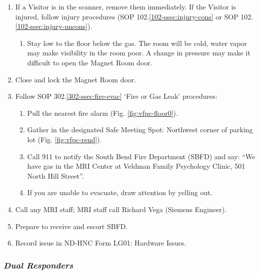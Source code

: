 \documentclass[11pt]{article}
\begin{document}
\begin{enumerate}
	\item If a Visitor is in the scanner, remove them immediately. If the Visitor is injured, follow injury procedures (SOP 102.\ref{102-ssec:injury-cons} or SOP 102.\ref{102-ssec:injury-uncons}).
	\begin{enumerate}
		\item Stay low to the floor below the gas. The room will be cold, water vapor may make visibility in the room poor. A change in pressure may make it difficult to open the Magnet Room door.
	\end{enumerate}
	\item Close and lock the Magnet Room door.
	\item Follow SOP 302.\ref{302-ssec:fire-evac} `Fire or Gas Leak' procedures:
	\begin{enumerate}
		\item Pull the nearest fire alarm (Fig. \ref{fig:vfpc-floor0}).
		\item Gather in the designated Safe Meeting Spot: Northwest corner of parking lot (Fig. \ref{fig:vfpc-rend}).
		\item Call 911 to notify the South Bend Fire Department (SBFD) and say: ``We have gas in the MRI Center at Veldman Family Psychology Clinic, 501 North Hill Street''.
		\item If you are unable to evacuate, draw attention by yelling out.
	\end{enumerate}
	\item Call any MRI staff; MRI staff call Richard Vega (Siemens Engineer).
	\item Prepare to receive and escort SBFD.
	\item Record issue in ND-HNC Form LG01: Hardware Issues.
\end{enumerate}

\subsubsection*{\textit{Dual Responders}}
\end{document}
